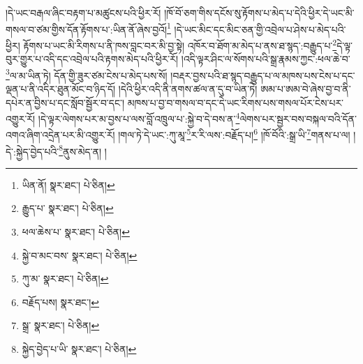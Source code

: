 །དེ་ཡང་བརྒལ་ཞིང་བརྟག་པ་མཚུངས་པའི་ཕྱིར་རོ། །ཁོ་བོ་ཅག་གིས་དངོས་སུ་རྟོགས་པ་མེད་པ་དེའི་ཕྱིར་དེ་ཡང་མི་གསལ་བ་ཙམ་གྱིས་དོན་རྟོགས་པ་:ཡིན་ནོ་ཞེས་བྱའོ།\footnote{ཡིན་ནོ།  སྣར་ཐང་།  པེ་ཅིན། } །དེ་ཡང་མིང་དང་མིང་ཅན་གྱི་འབྲེལ་པ་ཤེས་པ་མེད་པའི་ཕྱིར། རྟོགས་པ་ཡང་མི་རིགས་པ་ནི་ཁས་བླང་བར་མི་བྱ་སྟེ། འཁོར་བ་ཐོག་མ་མེད་པ་ནས་ཐ་སྙད་:བརྒྱུད་པ་\footnote{རྒྱུད་པ་  སྣར་ཐང་།  པེ་ཅིན། }དེ་ལྟ་བུར་གྱུར་པ་འདི་དང་འབྲེལ་པའི་རྟགས་མེད་པའི་ཕྱིར་རོ། །འདི་ལྟར་ཤིང་ལ་སོགས་པའི་སྒྲ་རྣམས་ཀྱང་:ཕལ་ཆེ་བ་\footnote{ཕལ་ཆེས་པ་  སྣར་ཐང་།  པེ་ཅིན། }ལ་མ་ཡིན་ཏེ། དོན་གྱི་ཟུར་ཙམ་ངེས་པ་མེད་པས་སོ། །བརྡར་བྱས་པའི་ཐ་སྙད་བརྒྱུད་པ་ལ་མཁས་པས་ངེས་པ་དང་ལྡན་པ་ནི་འདིར་ཐུན་མོང་བ་ཉིད་དོ། །དེའི་ཕྱིར་འདི་ནི་ནགས་ཚལ་ན་དུ་བ་ཡིན་ཏེ། ཨམ་པ་ཨམ་བེ་ཞེས་བྱ་བ་ནི་དཔེར་ན་བྱིས་པ་དང་སློབ་སྦྱོར་བ་དང་། མཁས་པ་བྱ་བ་གསལ་བ་དང་དེ་ཡང་རིགས་པས་གསལ་པོར་ངེས་པར་འགྱུར་རོ། །དེ་ལྟར་ལེགས་པར་མ་བྱས་པ་ལས་བློ་འཁྲུལ་པ་:སྐྱེ་བ་དེ་བས་ན་\footnote{སྐྱེ་བ་མང་བས་  སྣར་ཐང་།  པེ་ཅིན། }ལེགས་པར་སྦྱར་བས་བསྐལ་བའི་དོན་འགའ་ཞིག་འདྲེན་པར་མི་འགྱུར་རོ། །གལ་ཏེ་དེ་ཡང་:ཀུ་མཱ་\footnote{ཀུ་མ་  སྣར་ཐང་།  པེ་ཅིན། }ར་རི་ལས་:བརྗོད་པ།\footnote{བརྗོད་པས།  སྣར་ཐང་། } །ཁོ་བོའི་:སྒྲ་ཡི་\footnote{སྒྲ་  སྣར་ཐང་།  པེ་ཅིན། }གནས་པ་ལ། །དེ་:སྐྱེད་བྱེད་པའི་\footnote{སྐྱེད་བྱེད་པ་ཡི་  སྣར་ཐང་།  པེ་ཅིན། }ནུས་མེད་ན། །
